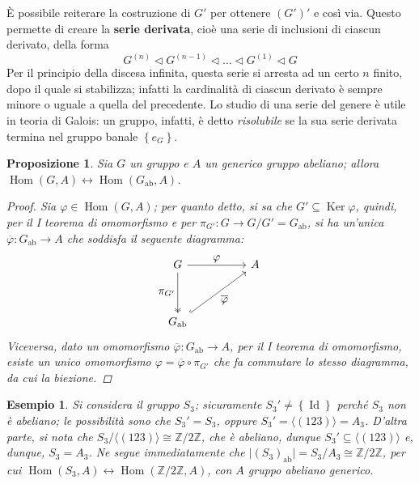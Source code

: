\documentclass[12pt]{scrartcl}
\theoremstyle{style}
\newtheorem{esempio}{Esempio}[section]
\newtheorem{prop}{Proposizione}[section]
\numberwithin{equation}{subsection}
\begin{document}
\noindent \`E possibile reiterare la costruzione di $G'$ per ottenere $(G')'$ e cos\`i via. 
Questo permette di creare la \textbf{serie derivata}, cio\`e una serie di inclusioni di ciascun derivato, della forma
\begin{equation}
	G^{(n)} \lhd G^{(n-1)} \lhd \ldots\lhd G^{(1)} \lhd G
\end{equation}
Per il principio della discesa infinita, questa serie si arresta ad un certo $n$ finito, dopo il quale si stabilizza; infatti la cardinalit\`a di ciascun derivato \`e sempre minore o uguale a quella del precedente.
Lo studio di una serie del genere \`e utile in teoria di Galois: un gruppo, infatti, \`e detto \textit{risolubile} se la sua serie derivata termina nel gruppo banale $\left\{ e_G \right\} $.

\begin{prop}
	Sia $G$ un gruppo e $A$ un generico gruppo abeliano; allora $\operatorname{Hom} (G,A) \longleftrightarrow \operatorname{Hom} (G_\text{ab},A)$.
	\begin{proof}
		Sia $\varphi \in \operatorname{Hom} (G,A)$; per quanto detto, si sa che $G' \subseteq \operatorname{Ker} \varphi $, quindi, per il I teorema di omomorfismo e per $\pi_{G'}:G\to G / G' = G_\text{ab} $, si ha un'unica $\overline{\varphi }:G_\text{ab}\to A$ che soddisfa il seguente diagramma:
		\[
		\begin{tikzcd}
			G & & A \\
			\\
G_\text{ab}
\arrow[from=1-1, to=1-3,"\displaystyle \varphi"]
\arrow[from=1-1, to=3-1,"\displaystyle \pi_{G'} "',two heads]
\arrow[from=3-1, to=1-3, "\displaystyle \overline{\varphi }"',hook]
		\end{tikzcd}
		\] 
		Viceversa, dato un omomorfismo $\overline{\varphi }:G_\text{ab}\to A$, per il I teorema di omomorfismo, esiste un unico omomorfismo $\varphi = \overline{\varphi }\circ \pi_{G'} $ che fa commutare lo stesso diagramma, da cui la biezione.
	\end{proof}
\end{prop}
\begin{esempio}
Si considera il gruppo $S_3$; sicuramente $S_3'\neq \left\{ \operatorname{Id}  \right\} $ perch\'e $S_3$ non \`e abeliano; le possibilit\`a sono che $S_3' = S_3$, oppure $S_3' = \langle (123) \rangle = A_3$.
D'altra parte, si nota che $S_3 / \langle (123) \rangle \cong \mathbb{Z}/2\mathbb{Z}$, che \`e abeliano, dunque $S_3' \subseteq \langle (123) \rangle$ e, dunque, $S_3 = A_3$.
Ne segue immediatamente che $\lvert (S_3)_\text{ab} \rvert = S_3 / A_3 \cong \mathbb{Z}/2\mathbb{Z}$, per cui $\operatorname{Hom} (S_3 , A) \longleftrightarrow \operatorname{Hom} (\mathbb{Z}/2\mathbb{Z},A)$, con $A$ gruppo abeliano generico.
\end{esempio}
\end{document}
